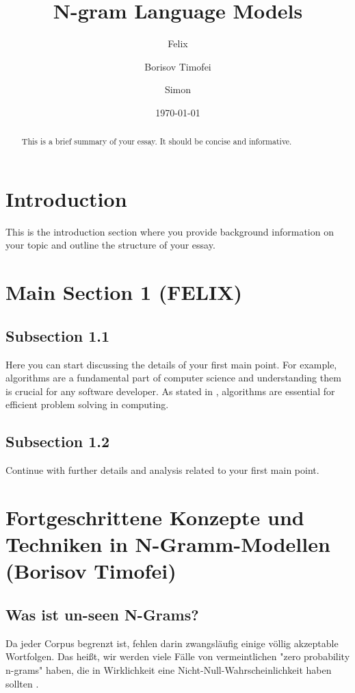 \documentclass[12pt]{article}
\title{N-gram Language Models}
\author{
  Felix \\
  \and
  Borisov Timofei \\
  \and
  Simon \\
}
\date{\today}
\begin{document}
\maketitle

\begin{abstract}
This is a brief summary of your essay. It should be concise and informative.
\end{abstract}

\tableofcontents
\newpage

\section{Introduction}
This is the introduction section where you provide background information on your topic and outline the structure of your essay.

\section{Main Section 1 (FELIX)}
\subsection{Subsection 1.1}
Here you can start discussing the details of your first main point. For example, algorithms are a fundamental part of computer science and understanding them is crucial for any software developer. As stated in \cite{cormen2009}, algorithms are essential for efficient problem solving in computing.

\subsection{Subsection 1.2}
Continue with further details and analysis related to your first main point.

\section{Fortgeschrittene Konzepte und Techniken in N-Gramm-Modellen (Borisov Timofei)}
\subsection{Was ist un-seen N-Grams?}
Da jeder Corpus begrenzt ist, fehlen darin zwangsläufig einige völlig akzeptable Wortfolgen. Das heißt, wir werden viele Fälle von vermeintlichen "zero probability n-grams" haben, die in Wirklichkeit eine Nicht-Null-Wahrscheinlichkeit haben sollten \cite{jurafsky2023}. 
\end{document}
